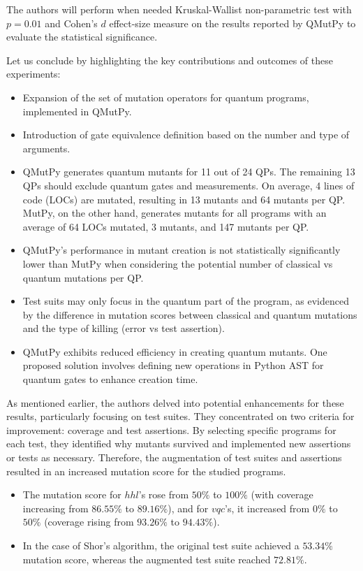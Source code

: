 \begin{itemize}
The authors will perform when needed Kruskal-Wallist non-parametric test with $p=0.01$ and Cohen's $d$ effect-size measure on the results reported by QMutPy to evaluate the statistical significance.\newline

Let us conclude by highlighting the key contributions and outcomes of these experiments:

\begin{itemize}
    \item Expansion of the set of mutation operators for quantum programs, implemented in QMutPy.
    \item Introduction of gate equivalence definition based on the number and type of arguments.
    \item QMutPy generates quantum mutants for 11 out of 24 QPs. The remaining 13 QPs should exclude quantum gates and measurements. On average, 4 lines of code (LOCs) are mutated, resulting in 13 mutants and 64 mutants per QP. MutPy, on the other hand, generates mutants for all programs with an average of 64 LOCs mutated, 3 mutants, and 147 mutants per QP.
    \item QMutPy's performance in mutant creation is not statistically significantly lower than MutPy when considering the potential number of classical vs quantum mutations per QP.
    \item Test suits may only focus in the quantum part of the program, as evidenced by the difference in mutation scores between classical and quantum mutations and the type of killing (error vs test assertion).
    \item QMutPy exhibits reduced efficiency in creating quantum mutants. One proposed solution involves defining new operations in Python AST for quantum gates to enhance creation time.
\end{itemize}

As mentioned earlier, the authors delved into potential enhancements for these results, particularly focusing on test suites. They concentrated on two criteria for improvement: coverage and test assertions. By selecting specific programs for each test, they identified why mutants survived and implemented new assertions or tests as necessary. Therefore, the augmentation of test suites and assertions resulted in an increased mutation score for the studied programs.

\begin{itemize}
    \item The mutation score for $hhl$’s rose from $50\%$ to $100\%$ (with coverage increasing from $86.55\%$ to $89.16\%$), and for $vqc$’s, it increased from $0\%$ to $50\%$ (coverage rising from $93.26\%$ to $94.43\%$).
    \item In the case of Shor's algorithm, the original test suite achieved a $53.34\%$ mutation score, whereas the augmented test suite reached $72.81\%$.
\end{itemize}


\end{itemize}
